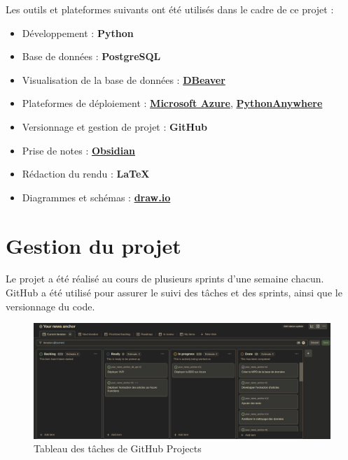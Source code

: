 \documentclass[french]{article}
\begin{document}
    Les outils et plateformes suivants ont été utilisés dans le cadre de ce projet :
    \begin{itemize}
        \item Développement : \textbf{Python}
        \item Base de données : \textbf{PostgreSQL}
        \item Visualisation de la base de données : \textbf{\href{https://dbeaver.io/}{DBeaver}}
        \item Plateformes de déploiement : \textbf{\href{https://azure.microsoft.com/fr-fr}{Microsoft Azure}}, \textbf{\href{https://www.pythonanywhere.com/}{PythonAnywhere}}
        \item Versionnage et gestion de projet : \textbf{GitHub}
        \item Prise de notes : \textbf{\href{https://obsidian.md/}{Obsidian}}
        \item Rédaction du rendu : \textbf{\LaTeX} 
        \item Diagrammes et schémas : \textbf{\href{https://app.diagrams.net/}{draw.io}}
    \end{itemize}
    
    \section{Gestion du projet}
    Le projet a été réalisé au cours de plusieurs sprints d'une semaine chacun. GitHub a été utilisé pour assurer le suivi des tâches et des sprints, ainsi que le versionnage du code.
    
    \begin{figure}[h]
        \includegraphics[width=12cm]{gh_projects}
        \centering
        \caption{Tableau des tâches de GitHub Projects}
        \centering
    \end{figure}
\end{document}
